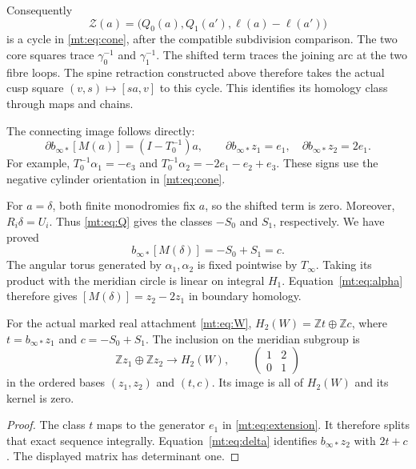 Consequently
\begin{equation}\label{mt:eq:Zchain}
\mathcal Z(a)=\bigl(Q_0(a),Q_1(a'),\ell(a)-\ell(a')\bigr)
\end{equation}
is a cycle in \eqref{mt:eq:cone}, after the compatible subdivision comparison.
The two core squares trace $\gamma_0^{-1}$ and $\gamma_1^{-1}$.
The shifted term traces the joining arc at the two fibre loops.
The spine retraction constructed above therefore takes the actual cusp
square $(v,s)\mapsto[sa,v]$ to this cycle.
This identifies its homology class through maps and chains.

The connecting image follows directly:
\begin{equation}\label{mt:eq:connecting}
\partial b_{\infty*}[M(a)]=(I-T_0^{-1})a,\qquad
\partial b_{\infty*}z_1=e_1,\quad
\partial b_{\infty*}z_2=2e_1.
\end{equation}
For example, $T_0^{-1}\alpha_1=-e_3$ and
$T_0^{-1}\alpha_2=-2e_1-e_2+e_3$.
These signs use the negative cylinder orientation in \eqref{mt:eq:cone}.

For $a=\delta$, both finite monodromies fix $a$, so the shifted term is zero.
Moreover, $R_i\delta=U_i$.
Thus \eqref{mt:eq:Q} gives the classes $-S_0$ and $S_1$, respectively.
We have proved
\begin{equation}\label{mt:eq:delta}
b_{\infty*}[M(\delta)]=-S_0+S_1=c.
\end{equation}
The angular torus generated by $\alpha_1,\alpha_2$ is fixed pointwise by $T_\infty$.
Taking its product with the meridian circle is linear on integral $H_1$.
Equation~\eqref{mt:eq:alpha} therefore gives
$[M(\delta)]=z_2-2z_1$ in boundary homology.

\begin{theorem}\label{mt:thm:map}
For the actual marked real attachment \eqref{mt:eq:W},
$H_2(W)=\mathbb Zt\oplus\mathbb Zc$, where
$t=b_{\infty*}z_1$ and $c=-S_0+S_1$.
The inclusion on the meridian subgroup is
\begin{equation}\label{mt:eq:answer}
\mathbb Zz_1\oplus\mathbb Zz_2\longrightarrow H_2(W),\qquad
\begin{pmatrix}1&2\\0&1\end{pmatrix}
\end{equation}
in the ordered bases $(z_1,z_2)$ and $(t,c)$.
Its image is all of $H_2(W)$ and its kernel is zero.
\end{theorem}
\begin{proof}
The class $t$ maps to the generator $e_1$ in \eqref{mt:eq:extension}.
It therefore splits that exact sequence integrally.
Equation~\eqref{mt:eq:delta} identifies $b_{\infty*}z_2$ with $2t+c$.
The displayed matrix has determinant one.
\end{proof}

